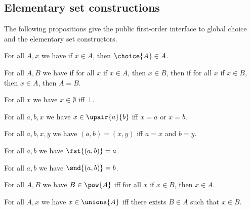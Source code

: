 \subsection{Elementary set constructions}

The following propositions give the public first-order interface to global
choice and the elementary set constructors.

\begin{proposition}\label{choice_member}
    For all $A,x$ we have if $x\in A$, then $\choice{A}\in A$.
\end{proposition}

\begin{proposition}\label{setext}
    For all $A,B$ we have
    if for all $x$ if $x\in A$, then $x\in B$, then
    if for all $x$ if $x\in B$, then $x\in A$, then
    $A=B$.
\end{proposition}

\begin{proposition}\label{emptyset}
    For all $x$ we have $x\in\emptyset$ iff $\bot$.
\end{proposition}

\begin{proposition}\label{pairset_iff}
    For all $a,b,x$ we have
    $x\in\upair{a}{b}$ iff $x=a$ or $x=b$.
\end{proposition}

\begin{proposition}\label{pair_eq_iff}
    For all $a,b,x,y$ we have
    $(a,b)=(x,y)$ iff $a=x$ and $b=y$.
\end{proposition}

\begin{proposition}\label{fst_eq}
    For all $a,b$ we have $\fst{(a,b)}=a$.
\end{proposition}

\begin{proposition}\label{snd_eq}
    For all $a,b$ we have $\snd{(a,b)}=b$.
\end{proposition}

\begin{proposition}[Powersets]\label{pow_iff}
    For all $A,B$ we have $B\in\pow{A}$ iff
    for all $x$ if $x\in B$, then $x\in A$.
\end{proposition}

\begin{proposition}\label{unions_iff}
    For all $A,x$ we have $x\in\unions{A}$ iff
    there exists $B\in A$ such that $x\in B$.
\end{proposition}


